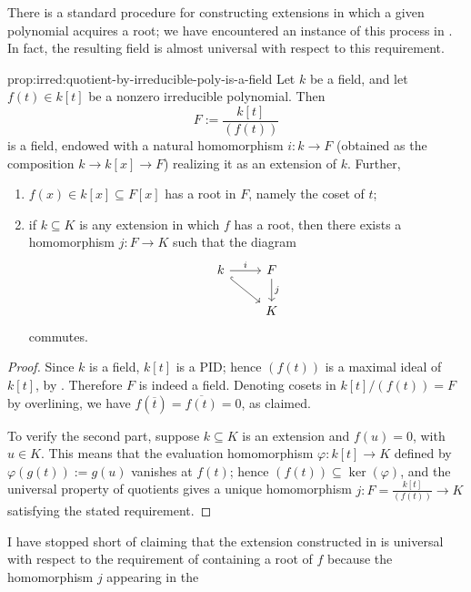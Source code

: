 There is a standard procedure for constructing extensions in which a
given polynomial acquires a root; we have encountered an instance of
this process in . In fact, the
resulting field is almost universal with respect to this requirement.
\begin{prop}{}{prop:irred:quotient-by-irreducible-poly-is-a-field}
  Let $k$ be a field, and let $f(t) \in k[t]$ be a nonzero irreducible
  polynomial. Then
  \[
    F := \frac{k[t]}{(f(t))}
  \]
  is a field, endowed with a natural homomorphism $i : k \to F$
  (obtained as the composition $k \to k[x] \to F$) realizing it as an
  extension of $k$. Further,
  \begin{enumerate}[label=(\arabic*)]
  \item $f(x) \in k[x] \subseteq F[x]$ has a root in $F$, namely the
    coset of $t$;
  \item if $k \subseteq K$ is any extension in which $f$ has a root,
    then there exists a homomorphism $j : F \to K$ such that the
    diagram
    \begin{equation*}
      \begin{tikzcd}
        k \ar[r, "i"] \ar[dr, hook] & F \ar[d, "j"] \\
        & K
      \end{tikzcd}
    \end{equation*}
    commutes.
  \end{enumerate}
\end{prop}
\begin{proof}
  Since $k$ is a field, $k[t]$ is a PID; hence $(f(t))$ is a maximal
  ideal of $k[t]$, by . Therefore
  $F$ is indeed a field. Denoting cosets in $k[t]/(f(t)) = F$ by
  overlining, we have $f(\overline{t}) = \overline{f(t)} = 0$, as
  claimed.

  To verify the second part, suppose $k \subseteq K$ is an extension
  and $f(u) = 0$, with $u \in K$. This means that the evaluation
  homomorphism $\varphi : k[t] \to K$ defined by
  $\varphi(g(t)) := g(u)$ vanishes at $f(t)$; hence
  $(f(t)) \subseteq \ker(\varphi)$, and the universal property of
  quotients gives a unique homomorphism
  $j : F = \frac{k[t]}{(f(t))} \to K$ satisfying the stated
  requirement.
\end{proof}
I have stopped short of claiming that the extension constructed in
 is universal with respect to the requirement of
containing a root of $f$ because the homomorphism $j$ appearing in the
